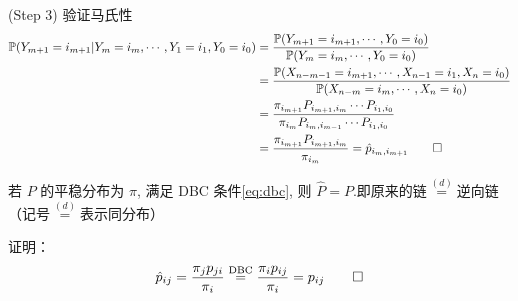 (Step 3) 验证马氏性
\[
\begin{aligned}
    \mathbb{P}(Y_{m+1}=i_{m+1}|Y_m=i_m,\cdots,Y_1=i_1,Y_0=i_0)&=\frac{\mathbb{P}(Y_{m+1}=i_{m+1},\cdots,Y_0=i_0)}{\mathbb{P}(Y_m=i_m,\cdots,Y_0=i_0)}\\
    &=\frac{\mathbb{P}(X_{n-m-1}=i_{m+1},\cdots,X_{n-1}=i_1,X_n=i_0)}{\mathbb{P}(X_{n-m}=i_m,\cdots,X_n=i_0)}\\
    &=\frac{\pi_{i_{m+1}}P_{i_{m+1},i_m}\cdots P_{i_1,i_0}}{\pi_{i_m}P_{i_m,i_{m-1}}\cdots P_{i_1,i_0}}\\
    &=\frac{\pi_{i_{m+1}}P_{i_{m+1},i_m}}{\pi_{i_m}}=\hat{p}_{i_m,i_{m+1}}\qed
\end{aligned}
\]
\begin{corollary}[可逆性]
    若 $P$ 的平稳分布为 $\pi$, 满足 DBC 条件\eqref{eq:dbc}, 则 $\hat{P}=P$.即原来的链$\overset{(d)}{=}$逆向链（记号$\overset{(d)}{=}$表示同分布）
\end{corollary}
证明：
\[
\hat{p}_{ij}=\frac{\pi_j p_{ji}}{\pi_i}\overset{\text{DBC}}{=}\frac{\pi_i p_{ij}}{\pi_i}=p_{ij}\qed
\]


